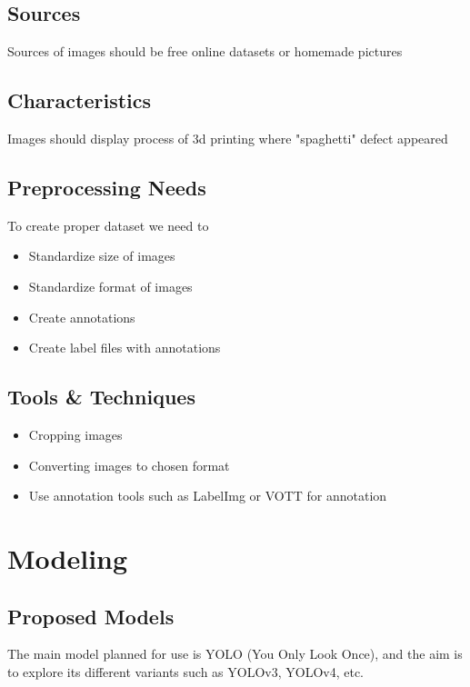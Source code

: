 \documentclass[12pt,a4paper]{article}
\begin{document}
\subsection{Sources}
Sources of images should be free online datasets or homemade pictures 
\subsection{Characteristics}
Images should display process of 3d printing where "spaghetti" defect appeared
\subsection{Preprocessing Needs}
To create proper dataset we need to 
\begin{itemize}
    \item Standardize size of images
    \item Standardize format of images
    \item Create annotations
    \item Create label files with annotations
\end{itemize}
\subsection{Tools \& Techniques}
\begin{itemize}
    \item Cropping images
    \item Converting images to chosen format
    \item Use annotation tools such as LabelImg or VOTT for annotation
\end{itemize}

\section{Modeling}
\subsection{Proposed Models}
The main model planned for use is YOLO (You Only Look Once), and the aim is to explore its different variants such as YOLOv3, YOLOv4, etc.
\end{document}
